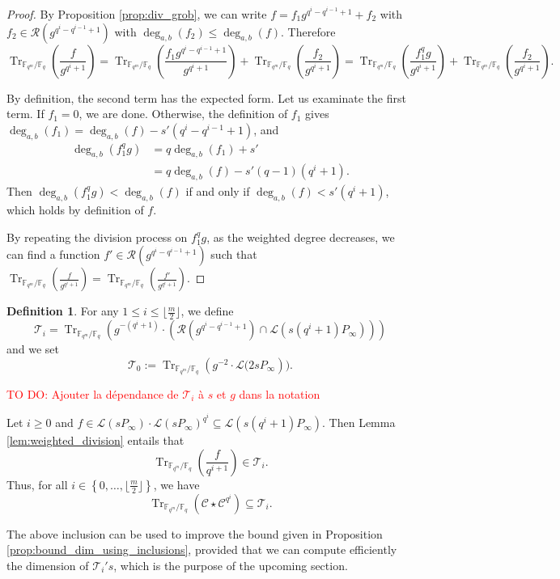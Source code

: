 \documentclass[a4paper]{article}
\theoremstyle{definition}
\newtheorem{definition}[thm]{Definition}
\theoremstyle{remark}
\newcommand{\calL}{\mathcal{L}}
\newcommand{\calC}{\mathcal{C}}
\newcommand{\calR}{\mathcal{R}}
\newcommand{\calT}{\mathcal{T}}
\newcommand{\fq}{\mathbb{F}_{q}}
\newcommand{\Tr}[1]{\operatorname{Tr}_{\mathbb{F}_{q^m}/\fq}\left(#1\right)}
\newcommand{\set}[1]{\left\{#1\right\}}
\newcommand{\degab}[1]{\deg_{a,b}\left(#1\right)}
\newcommand\TODO[1]{\textcolor{red}{TO DO: #1}}
\begin{document}
\begin{proof}

By Proposition \ref{prop:div_grob}, we can write $f=f_1 g^{q^i-q^{i-1}+1} +f_2$ with
	$f_2 \in \calR\left(g^{q^i-q^{i-1}+1}\right)$ with $\degab{f_2} \leq \degab{f}$. Therefore
	\[\Tr{\frac{f}{g^{q^i+1}}}=\Tr{\frac{f_1 g^{q^i-q^{i-1}+1}}{g^{q^i+1}}} +\Tr{\frac{f_2}{g^{q^i+1}}}= \Tr{\frac{f_1^qg}{g^{q^i+1}}} +\Tr{\frac{f_2}{g^{q^i+1}}}. \]
	
	By definition, the second term has the expected form. Let us examinate the first term. If $f_1=0$, we are done. Otherwise, the definition of $f_1$ gives
$\degab{f_1} =\degab{f} - s'(q^i-q^{i-1}+1)$, and
	\begin{align*}
	\degab{f_1^qg} 	&= q \degab{f_1} + s'\\
					&= q\degab{f} - s'(q-1)(q^i+1).
	\end{align*} 
Then  $\degab{f_1^qg} < \degab{f}$ if and only if $\degab{f} < s'(q^i+1)$, which holds by definition of $f$.

By repeating the division process on $f_1^qg$, as the weighted degree decreases, we can find a function $f' \in \calR\left(g^{q^i-q^{i-1}+1}\right)$ such that $\Tr{\frac{f}{g^{q^i+1}}} = \Tr{\frac{f'}{g^{q^i+1}}} $.

\end{proof}

\begin{definition} \label{def:T_i's}
For any $1 \leq i \leq \lfloor\frac{m}{2}\rfloor$, we define
$$\calT_i= \Tr{g^{-(q^i+1)}\cdot \left( \calR\left(g^{q^i-q^{i-1}+1}\right)  \cap \calL(s(q^i+1)P_\infty)\right)}$$
and we set $$\calT_0 := \Tr{g^{-2} \cdot \calL(2sP_\infty}).$$
\end{definition}

\TODO{Ajouter la dépendance de $\calT_i$ à $s$ et $g$ dans la notation}
	
\noindent Let $i \geq 0$ and $f \in \calL(sP_\infty) \cdot \calL(sP_\infty)^{q^i} \subseteq \calL(s(q^i+1)P_\infty)$. Then 
Lemma \ref{lem:weighted_division} entails that 
$$\Tr{\dfrac{f}{q^{i+1}}} \in \calT_i.$$
Thus, for all $i \in \set{0,\dots,\lfloor \frac{m}{2} \rfloor}$, we have \begin{equation} \label{eq:Tr(C*C^q^i)_dans_T_i}
\Tr{\calC \star \calC^{q^i}} \subseteq \calT_i.
\end{equation}

\noindent The above inclusion can be used to improve the bound given in Proposition \ref{prop:bound_dim_using_inclusions}, provided that we can compute efficiently the dimension of $\calT_i's$, which is the purpose of the upcoming section.
\end{document}

